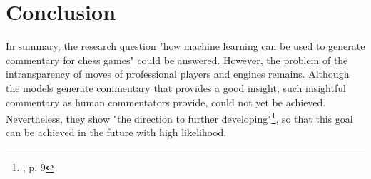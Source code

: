 \section{Conclusion}

In summary, the research question "how machine learning can be used to generate commentary for chess games" could be answered. However, the problem of the intransparency of moves of professional players and engines remains. Although the models generate commentary that provides a good insight, such insightful commentary as human commentators provide, could not yet be achieved. Nevertheless, they show "the direction to further developing"\footnote{\cite{zang-etal-2019-automated}, p. 9}, so that this goal can be achieved in the future with high likelihood. 